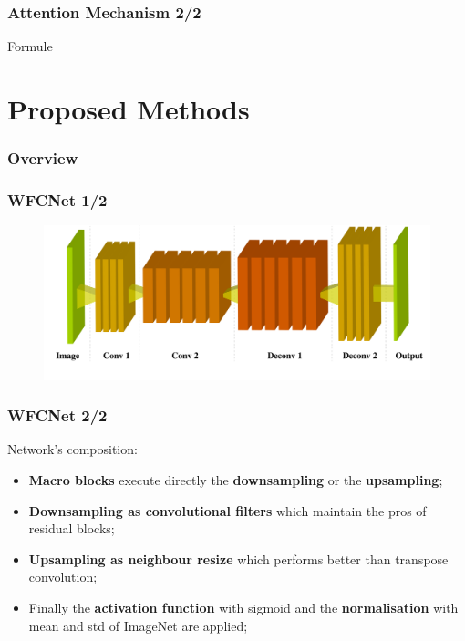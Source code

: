 \documentclass{beamer}
\begin{document}
\begin{frame}
\frametitle{Attention Mechanism 2/2}

Formule

\end{frame}

\section{Proposed Methods}

\begin{frame}
\frametitle{Overview} 
	\tableofcontents[currentsection]
\end{frame}

\begin{frame}
\frametitle{WFCNet 1/2}

\begin{figure}
\includegraphics[width=\textwidth]{../schemi/colorization_img}
\end{figure}
 
\end{frame}

\begin{frame}
\frametitle{WFCNet 2/2}

Network's composition:
\begin{itemize}
\item \textbf{Macro blocks} execute directly the \textbf{downsampling} or the \textbf{upsampling};
\item \textbf{Downsampling as convolutional filters} which maintain the pros of residual blocks;
\item \textbf{Upsampling as neighbour resize} which performs better than transpose convolution;
\item Finally the \textbf{activation function} with sigmoid and the \textbf{normalisation} with mean and std of ImageNet are applied;
\end{itemize}
 
\end{frame}
\end{document}
